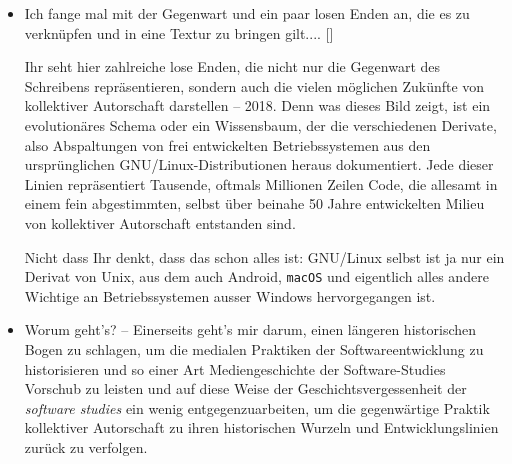 \documentclass[a4paper,11pt]{article}
\newcommand{\anzeige}{\textbf{\color{hokkaido}\huge{\raisebox{-0.18ex}{$\bullet$}}\color{black}}}
\begin{document}
\begin{comment}
Viele Pfade und Pfadabhängigkeiten gilt es zu verfolgen.

dass der . Hier: die Unterschiede, und zwar die Unterschiede in den Texten.

Welche historischen Vergleiche? Die Korrektoren.

Darüber die Brücke zur Auto(r)Korrektur. Hier die Notwendigkeit, mimetischer Praktiken ins Spiel bringen...

\end{comment}

\begin{itemize}
\item Ich fange mal mit der Gegenwart und ein paar losen Enden an, die es zu verknüpfen und in eine Textur zu bringen gilt.... [\anzeige]



Ihr seht hier zahlreiche lose Enden, die nicht nur die Gegenwart des Schreibens repräsentieren, sondern auch die vielen möglichen Zukünfte von kollektiver Autorschaft darstellen – 2018. Denn was dieses Bild zeigt, ist ein evolutionäres Schema oder ein Wissensbaum, der die verschiedenen Derivate, also Abspaltungen von frei entwickelten Betriebssystemen aus den ursprünglichen GNU/Linux-Distributionen heraus dokumentiert. Jede dieser Linien repräsentiert Tausende, oftmals Millionen Zeilen Code, die allesamt in einem fein abgestimmten, selbst über beinahe 50 Jahre entwickelten Milieu von kollektiver Autorschaft entstanden sind. 

Nicht dass Ihr denkt, dass das schon alles ist: GNU/Linux selbst ist ja nur ein Derivat von Unix, aus dem auch Android, \verb+macOS+ und eigentlich alles andere Wichtige an Betriebssystemen ausser Windows hervorgegangen ist. \anzeige

\item Worum geht's? – Einerseits geht's mir darum, einen längeren historischen Bogen zu schlagen, um die medialen Praktiken der Softwareentwicklung zu historisieren und so einer Art Mediengeschichte der Software-Studies Vorschub zu leisten und auf diese Weise der Geschichtsvergessenheit der \emph{software studies} ein wenig entgegenzuarbeiten, um die gegenwärtige Praktik kollektiver Autorschaft zu ihren historischen Wurzeln und Entwicklungslinien zurück zu verfolgen.%


\end{itemize}
\end{document}
